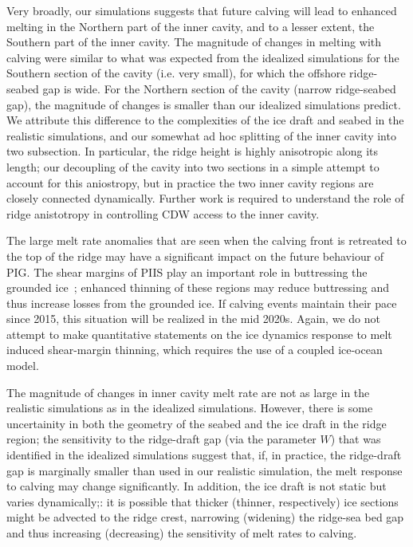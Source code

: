 \documentclass[draft]{agujournal2019}
\begin{document}
Very broadly, our simulations suggests that future calving will lead to enhanced melting in the Northern part of the inner cavity, and to a lesser extent, the Southern part of the inner cavity. The magnitude of changes in melting with calving were similar to what was expected from the idealized simulations for the Southern section of the cavity (i.e. very small), for which the offshore ridge-seabed gap is wide. For the Northern section of the cavity (narrow ridge-seabed gap), the magnitude of changes is smaller than our idealized simulations predict. We attribute this difference to the complexities of the ice draft and seabed in the realistic simulations, and our somewhat ad hoc splitting of the inner cavity into two subsection. In particular, the ridge height is highly anisotropic along its length; our decoupling of the cavity into two sections in a simple attempt to account for this aniostropy, but in practice the two inner cavity regions are closely connected dynamically. Further work is required to understand the role of ridge anistotropy in controlling CDW access to the inner cavity.

The large melt rate anomalies that are seen when the calving front is retreated to the top of the ridge may have a significant impact on the future behaviour of PIG. The shear margins of PIIS play an important role in buttressing the grounded ice~\cite{Lhermitte2020PNAS}; enhanced thinning of these regions may reduce buttressing and thus increase losses from the grounded ice. If calving events maintain their pace since 2015, this situation will be realized in the mid 2020s. Again, we do not attempt to make quantitative statements on the ice dynamics response to melt induced shear-margin thinning, which requires the use of a coupled ice-ocean model.

The magnitude of changes in inner cavity melt rate are not as large in the realistic simulations as in the idealized simulations. However, there is some uncertainity in both the geometry of the seabed and the ice draft in the ridge region; the sensitivity to the ridge-draft gap (via the parameter $W$) that was identified in the idealized simulations suggest that, if, in practice, the ridge-draft gap is marginally smaller than used in our realistic simulation, the melt response to calving may change significantly. In addition, the ice draft is not static but varies dynamically;: it is possible that thicker (thinner, respectively) ice sections might be advected to the ridge crest, narrowing (widening) the ridge-sea bed gap and thus increasing (decreasing) the sensitivity of melt rates to calving.
\end{document}
